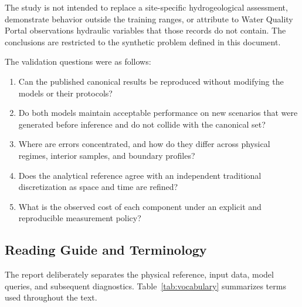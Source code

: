 \documentclass[11pt,a4paper]{article}
\begin{document}
The study is not intended to replace a site-specific hydrogeological
assessment, demonstrate behavior outside the training ranges, or attribute to
Water Quality Portal observations hydraulic variables that those records do
not contain. The conclusions are restricted to the synthetic problem defined
in this document.

The validation questions were as follows:

\begin{enumerate}
    \item Can the published canonical results be reproduced without modifying
    the models or their protocols?
    \item Do both models maintain acceptable performance on new scenarios that
    were generated before inference and do not collide with the canonical set?
    \item Where are errors concentrated, and how do they differ across
    physical regimes, interior samples, and boundary profiles?
    \item Does the analytical reference agree with an independent traditional
    discretization as space and time are refined?
    \item What is the observed cost of each component under an explicit and
    reproducible measurement policy?
\end{enumerate}

\subsection{Reading Guide and Terminology}

The report deliberately separates the physical reference, input data, model
queries, and subsequent diagnostics. Table~\ref{tab:vocabulary} summarizes
terms used throughout the text.
\end{document}
